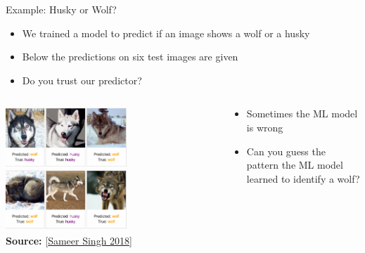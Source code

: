 \documentclass[11pt,compress,t,notes=noshow, aspectratio=169, xcolor=table]{beamer}
\begin{document}
\begin{frame}[c]{Example: Husky or Wolf?}
	\begin{itemize}
		\item We trained a model to predict if an image shows a wolf or a husky 
		\item Below the predictions on six test images are given 
		\item Do you trust our predictor? 
	\end{itemize}
	
	\begin{columns}
	
	\begin{column}{0.6\textwidth}
	    
    	\begin{center}
    		\includegraphics[width=0.58\textwidth]{figure/lime-wolfhusky.png}\\
    		\includegraphics[width=0.58\textwidth]{figure/lime-wolfhusky2.png}\\
    		{\textbf{Source:} [\href{http://www.facweb.iitkgp.ac.in/~niloy/COURSE/Spring2018/IntelligentSystem/PPT_2018/why_should_i_trust_ppt.pdf}{Sameer Singh 2018}]}
    	\end{center}
	    
	\end{column}
	
	\begin{column}{0.4\textwidth}
	    
	\begin{itemize}
		\item Sometimes the ML model is wrong
		\item Can you guess the pattern the ML model learned to identify a wolf?
	\end{itemize}
	    
	\end{column}
	    
	\end{columns}

\end{frame}
\end{document}
